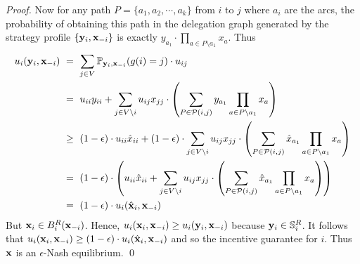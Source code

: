 \begin{proof}
Now for any path $P=\{a_1,a_2,\cdots, a_k\}$ from $i$ to $j$ where $a_i$ are the arcs, the probability of obtaining 
this path in the delegation graph generated by the strategy profile $\{{\bf y}_i, {\bf x}_{-i}\}$ is exactly $y_{a_1}\cdot  \prod\limits_{a\in P\setminus a_1} x_a$. 
Thus
\begin{align*}
		u_i({\bf y}_i,{\bf x}_{-i}) 
		&\ =\  \sum_{j\in V} \mathbb{P}_{{\bf y}_i,{\bf x}_{-i}}( g(i)=j  ) \cdot u_{ij} \\
		&\ =\ u_{ii}y_{ii} + \sum_{j\in V\setminus i} u_{ij} x_{jj}  
			\cdot \left( \sum_{P \in \mathcal{P}(i,j)} y_{a_1}  \prod\limits_{a\in P\setminus a_1} x_a\right) \\  	   		
		&\ \geq\ (1-\epsilon)\cdot u_{ii}\hat{x}_{ii} + (1-\epsilon)\cdot \sum_{j\in V\setminus i} u_{ij} x_{jj} 
		\cdot \left( \sum_{P \in \mathcal{P}(i,j)} \hat{x}_{a_1}  \prod\limits_{a\in P\setminus a_1} x_a\right) \\ 
		&\ =\ (1-\epsilon)\cdot \left(u_{ii}\hat{x}_{ii} + \sum_{j\in V\setminus i} u_{ij} x_{jj}  
		\cdot \left( \sum_{P \in \mathcal{P}(i,j)} \hat{x}_{a_1}  \prod\limits_{a\in P\setminus a_1} x_a\right)\right) \\
		&\ =\ (1-\epsilon) \cdot u_{i}(\hat{{\bf x}}_i,{\bf x}_{-i})
\end{align*}
But ${\bf x}_i\in B^R_i({\bf x}_{-i})$. Hence, $u_i({\bf x}_i,{\bf x}_{-i})\geq u_i({\bf y}_i,{\bf x}_{-i})$ because ${\bf y}_i\in \mathbb{S}^R_i$.
It follows that $u_i({\bf x}_i,{\bf x}_{-i})\geq (1-\epsilon)\cdot u_i(\hat{{\bf x}}_i,{\bf x}_{-i})$
and so the incentive guarantee for $i$.
Thus ${\bf x}$ is an $\epsilon$-Nash equilibrium. \qed  	
\end{proof}

